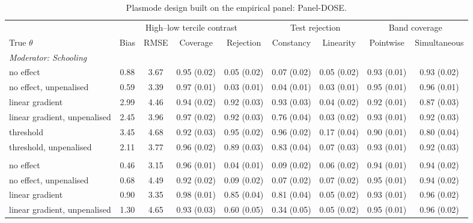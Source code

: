\documentclass[preprint,12pt,authoryear]{elsarticle}
\begin{document}
\begin{table}[!t]
\centering
\begin{threeparttable}
\caption{Plasmode design built on the empirical panel: Panel-DOSE.}\label{tab:plasmode}
\scriptsize
\setlength{\tabcolsep}{2.5pt}
\begin{tabular}{lcccccccc}
\toprule
 & \multicolumn{4}{c}{High--low tercile contrast} & \multicolumn{2}{c}{Test rejection} & \multicolumn{2}{c}{Band coverage}\\
\cmidrule(lr){2-5}\cmidrule(lr){6-7}\cmidrule(lr){8-9}
True $\theta$ & Bias & RMSE & Coverage & Rejection & Constancy & Linearity & Pointwise & Simultaneous\\
\midrule
\multicolumn{9}{l}{\textit{Moderator: Schooling}}\\
\quad no effect & 0.88 & 3.67 & 0.95 (0.02) & 0.05 (0.02) & 0.07 (0.02) & 0.05 (0.02) & 0.93 (0.01) & 0.93 (0.02)\\
\quad no effect, unpenalised & 0.59 & 3.39 & 0.97 (0.01) & 0.03 (0.01) & 0.04 (0.01) & 0.03 (0.01) & 0.95 (0.01) & 0.96 (0.01)\\
\quad linear gradient & 2.99 & 4.46 & 0.94 (0.02) & 0.92 (0.03) & 0.93 (0.03) & 0.04 (0.02) & 0.92 (0.01) & 0.87 (0.03)\\
\quad linear gradient, unpenalised & 2.45 & 3.96 & 0.97 (0.02) & 0.92 (0.03) & 0.76 (0.04) & 0.03 (0.02) & 0.93 (0.01) & 0.92 (0.03)\\
\quad threshold & 3.45 & 4.68 & 0.92 (0.03) & 0.95 (0.02) & 0.96 (0.02) & 0.17 (0.04) & 0.90 (0.01) & 0.80 (0.04)\\
\quad threshold, unpenalised & 2.11 & 3.77 & 0.96 (0.02) & 0.89 (0.03) & 0.83 (0.04) & 0.07 (0.03) & 0.93 (0.01) & 0.92 (0.03)\\
\addlinespace
\multicolumn{9}{l}{\textit{Moderator: Initial productivity}}\\
\quad no effect & 0.46 & 3.15 & 0.96 (0.01) & 0.04 (0.01) & 0.09 (0.02) & 0.06 (0.02) & 0.94 (0.01) & 0.94 (0.02)\\
\quad no effect, unpenalised & 0.68 & 4.49 & 0.92 (0.02) & 0.09 (0.02) & 0.07 (0.02) & 0.07 (0.02) & 0.95 (0.01) & 0.94 (0.02)\\
\quad linear gradient & 0.90 & 3.35 & 0.98 (0.01) & 0.85 (0.04) & 0.81 (0.04) & 0.05 (0.02) & 0.93 (0.01) & 0.96 (0.02)\\
\quad linear gradient, unpenalised & 1.30 & 4.65 & 0.93 (0.03) & 0.60 (0.05) & 0.34 (0.05) & 0.05 (0.02) & 0.95 (0.01) & 0.96 (0.02)\\

\end{tabular}
\end{threeparttable}
\end{table}
\end{document}
